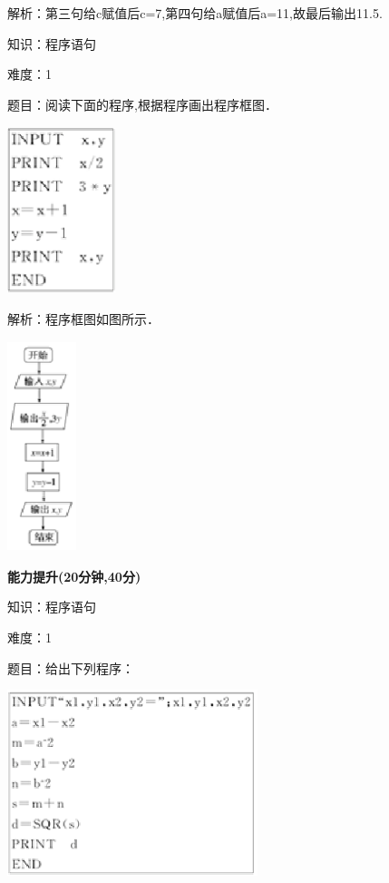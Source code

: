 \documentclass{article} %
\begin{document}
解析：第三句给c赋值后c=7,第四句给a赋值后a=11,故最后输出11.5.

知识：程序语句

难度：1

题目：阅读下面的程序,根据程序画出程序框图．

\textit{\includegraphics*[width=1.25in, height=1.92in, keepaspectratio=false]{image36}}

解析：程序框图如图所示．

\noindent 
{\bf \includegraphics*[width=0.79in, height=2.41in, keepaspectratio=false]{image37}}

\noindent 
{\bf {\textbar}能力提升{\textbar}(20分钟,40分)}

知识：程序语句

难度：1

题目：给出下列程序：

\includegraphics*[width=2.87in, height=2.14in, keepaspectratio=false]{image38}
\end{document}

